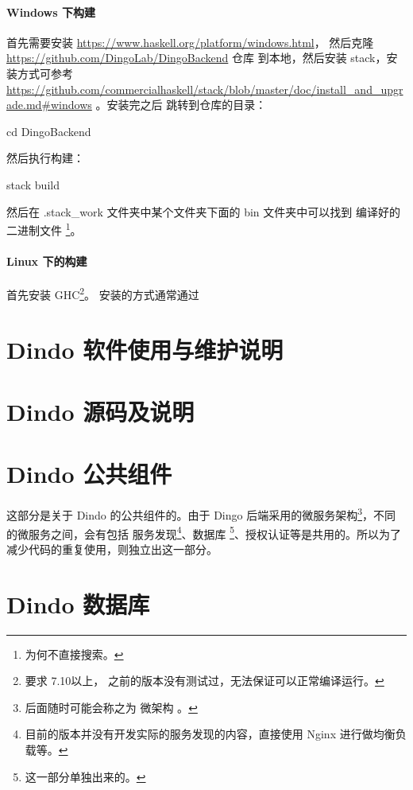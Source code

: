 \documentclass{dingo}
\begin{document}
					\paragraph{Windows 下构建}
						首先需要安装 \href{Haskell Platform 7.10.3 x64}{https://www.haskell.org/platform/windows.html}，
						然后克隆 \href{GitHub/DingoLab/DingoBackend}{https://github.com/DingoLab/DingoBackend} 仓库
						到本地，然后安装 stack，安装方式可参考 \href{Stack Install \& Upgrade}{https://github.com/commercialhaskell/stack/blob/master/doc/install\_and\_upgrade.md\#windows}
						。安装完之后 跳转到仓库的目录：
						\begin{cmd}
							cd DingoBackend
						\end{cmd}
						然后执行构建：
						\begin{cmd}
							stack build
						\end{cmd}
						然后在 .stack\_work 文件夹中某个文件夹下面的 bin 文件夹中可以找到 编译好的二进制文件
						\footnote{为何不直接搜索。}。

					\paragraph{Linux 下的构建}
						首先安装 GHC\footnote{要求 7.10以上， 之前的版本没有测试过，无法保证可以正常编译运行。}。
						安装的方式通常通过



  	\section{Dindo 软件使用与维护说明}

    \section{Dindo 源码及说明}

    \section{Dindo 公共组件}
    这部分是关于 Dindo 的公共组件的。由于 Dingo 后端采用的微服务架构\footnote{后面随时可能会称之为 微架构 。}，不同的微服务之间，会有包括
    服务发现\footnote{目前的版本并没有开发实际的服务发现的内容，直接使用 Nginx 进行做均衡负载等。}、数据库
  \footnote{这一部分单独出来的。}、授权认证等是共用的。所以为了减少代码的重复使用，则独立出这一部分。

  \section{Dindo 数据库}
\end{document}
